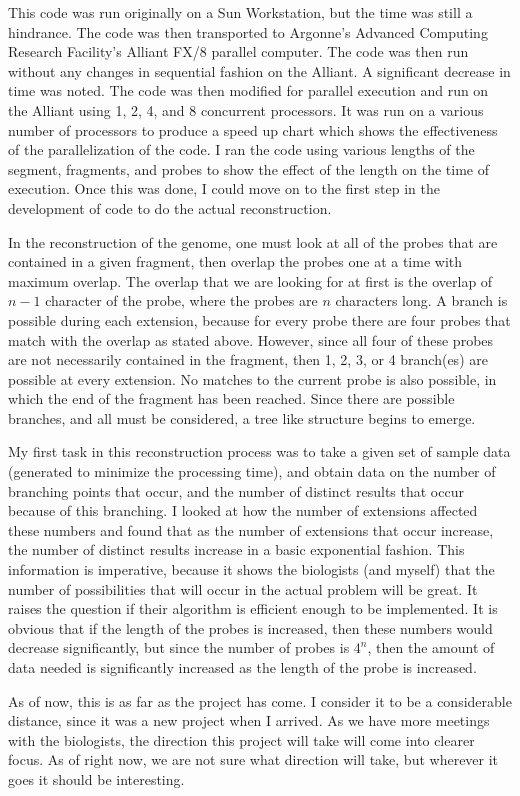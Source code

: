 This code was run originally on a Sun Workstation, but the time was still
a hindrance.  The code was then transported to Argonne's Advanced
Computing Research Facility's Alliant FX/8 parallel computer.  The code was
then run without any changes in sequential fashion on the Alliant.  A
significant decrease in time was noted.  The code was then modified for
parallel execution and run on the Alliant using 1, 2, 4, and 8 concurrent
processors.  It was run on a various number of processors to produce a
speed up chart which shows the effectiveness of the parallelization of
the code.  I ran the code using various lengths of the segment,
fragments, and probes to show the effect of the length on the time of
execution.  Once this was done, I could move on to the first step in the
development of code to do the actual reconstruction.

In the reconstruction of the genome, one must look at all of
the probes that are contained in a given fragment, then overlap the
probes one at a time with maximum overlap.  The overlap that we are
looking for at first is the overlap of $n-1$ character of the probe, where
the probes are $n$ characters long.  A branch is possible during each 
extension, because for every probe there are four probes that match with
the overlap as stated above.  However, since all four of these probes are
not necessarily contained in the fragment, then 1, 2, 3, or 4 branch(es)
are possible at every extension.
No matches to the current probe is also possible, in which
the end of the fragment has been reached.  Since there are possible
branches, and all must be considered, a tree like structure begins to
emerge.

My first task in this reconstruction process was to take a given set of
sample data (generated to minimize the processing time), and obtain data
on the number of branching points that occur, and the number of distinct
results that occur because of this branching.  I looked at how the number
of extensions affected these numbers and found that as the number of
extensions that occur increase, the number of distinct results increase
in a basic exponential fashion.  This information is imperative, because
it shows the biologists (and myself) that the number of possibilities that
will occur in the actual problem will be great.  It raises the question
if their algorithm is efficient enough to be implemented.  It is obvious
that if the length of the probes is increased, then these numbers would
decrease significantly, but since the number of probes is $4^n$, then the
amount of data needed is significantly increased as the length of the
probe is increased. 

As of now, this is as far as the project has come.  I consider it to be a
considerable distance, since it was a new project when I arrived.  As we
have more meetings with the biologists, the direction this project will
take will come into clearer focus.  As of right now, we are not sure what
direction will take, but wherever it goes it should be interesting.

